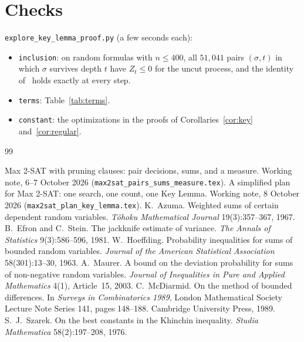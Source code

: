 \documentclass[11pt,a4paper]{article}
\theoremstyle{remark}
\begin{document}
\section{Checks}\label{sec:checks}

\texttt{explore\_key\_lemma\_proof.py} (a few seconds each):
\begin{itemize}
 \item \texttt{inclusion}: on random formulas with $n\le400$, all $51{,}041$
 pairs $(\sigma,t)$ in which $\sigma$ survives depth $t$ have $Z_t\le0$ for the
 uncut process, and the identity of~\cite[Lemma~2]{N7} holds exactly at every
 step.
 \item \texttt{terms}: Table~\ref{tab:terms}.
 \item \texttt{constant}: the optimizations in the proofs of
 Corollaries~\ref{cor:key} and~\ref{cor:regular}.
\end{itemize}

\begin{thebibliography}{99}
\raggedright
{} Max 2-SAT with pruning clauses: pair decisions, sums, and a
 measure. Working note, 6--7 October 2026
 (\texttt{max2sat\_pairs\_sums\_measure.tex}).
 A simplified plan for Max 2-SAT: one search, one count, one Key
 Lemma. Working note, 8 October 2026 (\texttt{max2sat\_plan\_key\_lemma.tex}).
 K.~Azuma. Weighted sums of certain dependent random variables.
 \emph{T\^ohoku Mathematical Journal} 19(3):357--367, 1967.
 B.~Efron and C.~Stein. The jackknife estimate of variance.
 \emph{The Annals of Statistics} 9(3):586--596, 1981.
 W.~Hoeffding. Probability inequalities for sums of bounded
 random variables. \emph{Journal of the American Statistical Association}
 58(301):13--30, 1963.
 A.~Maurer. A bound on the deviation probability for sums of
 non-negative random variables. \emph{Journal of Inequalities in Pure and
 Applied Mathematics} 4(1), Article~15, 2003.
 C.~McDiarmid. On the method of bounded differences. In
 \emph{Surveys in Combinatorics 1989}, London Mathematical Society Lecture Note
 Series 141, pages 148--188. Cambridge University Press, 1989.
 S.~J.~Szarek. On the best constants in the Khinchin inequality.
 \emph{Studia Mathematica} 58(2):197--208, 1976.
\end{thebibliography}
\end{document}
